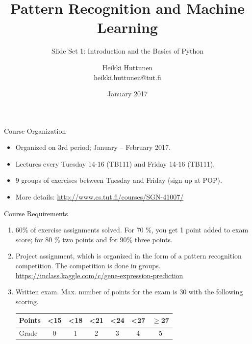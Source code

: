 \documentclass[10pt, aspectratio=169]{beamer} %
\title{Pattern Recognition and Machine Learning}
\subtitle{Slide Set 1: Introduction and the Basics of Python}
\author{Heikki Huttunen\\
heikki.huttunen@tut.fi}
\institute{Laboratory of Signal Processing\\Tampere University of Technology}
\date{January 2017}
\begin{document}
\maketitle


\lstset{language=Python,style=mystyle} 


\begin{frame}[allowframebreaks=0.8]
 {Course Organization}
\begin{itemize}

\item Organized on 3rd period; January -- February 2017.
\item Lectures every Tuesday 14-16 (TB111) and Friday 14-16 (TB111).
\item 9 groups of exercises between Tuesday and Friday (sign up at POP).
\item More details: \url{http://www.cs.tut.fi/courses/SGN-41007/}
\end{itemize}
\end{frame}

\begin{frame}[allowframebreaks=0.8]
 {Course Requirements}
\begin{enumerate}
\item 60\% of exercise assignments solved. For 70 \%, you get 1 point added to exam score;
for 80 \% two points and for 90\% three points. 
\item Project assignment, which is organized in the form of a pattern recognition competition. 
The competition is done in groups. \url{https://inclass.kaggle.com/c/gene-expression-prediction}
\item Written exam. Max. number of points for the exam is 30
with the following scoring.
\begin{center}
	\begin{tabular}{|| l || c | c | c | c | c | c ||}
	\hline\hline
	Points & <15 & <18 & <21 & <24 & <27 & $\ge$27 \\
	\hline
	Grade & 0 & 1 & 2 & 3 & 4 & 5 \\
	\hline\hline
	\end{tabular}
\end{center}

\end{enumerate}
\end{frame}
\end{document}
